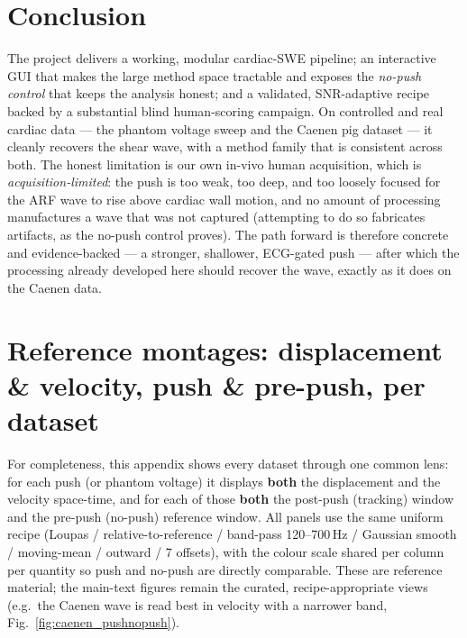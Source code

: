 \documentclass[11pt,a4paper]{article}
\begin{document}
\section{Conclusion}
The project delivers a working, modular cardiac-SWE pipeline; an interactive GUI that makes the large method
space tractable and exposes the \emph{no-push control} that keeps the analysis honest; and a validated,
SNR-adaptive recipe backed by a substantial blind human-scoring campaign. On controlled and real cardiac
data --- the phantom voltage sweep and the Caenen pig dataset --- it cleanly recovers the shear wave, with a
method family that is consistent across both. The honest limitation is our own in-vivo human acquisition,
which is \emph{acquisition-limited}: the push is too weak, too deep, and too loosely focused for the ARF wave
to rise above cardiac wall motion, and no amount of processing manufactures a wave that was not captured
(attempting to do so fabricates artifacts, as the no-push control proves). The path forward is therefore
concrete and evidence-backed --- a stronger, shallower, ECG-gated push --- after which the processing already
developed here should recover the wave, exactly as it does on the Caenen data.

\appendix
\section{Reference montages: displacement \& velocity, push \& pre-push, per dataset}\label{sec:appendix}
For completeness, this appendix shows every dataset through one common lens: for each push (or phantom
voltage) it displays \textbf{both} the displacement and the velocity space-time, and for each of those
\textbf{both} the post-push (tracking) window and the pre-push (no-push) reference window. All panels use
the same uniform recipe (Loupas / relative-to-reference / band-pass 120--700\,Hz / Gaussian smooth /
moving-mean / outward / 7 offsets), with the colour scale shared per column per quantity so push and
no-push are directly comparable. These are reference material; the main-text figures remain the curated,
recipe-appropriate views (e.g.\ the Caenen wave is read best in velocity with a narrower band,
Fig.~\ref{fig:caenen_pushnopush}).
\end{document}
